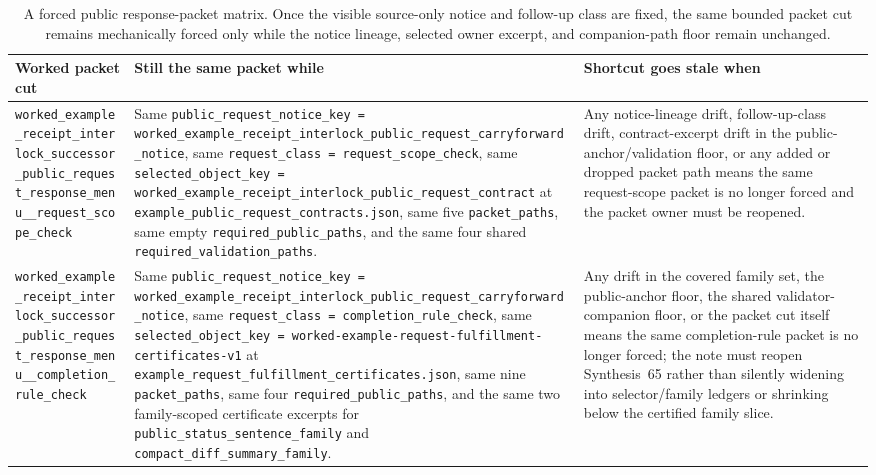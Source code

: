 \documentclass[11pt]{article}
\begin{document}
\begin{table}[t]
\centering
\footnotesize
\begin{tabularx}{\linewidth}{@{}lX X@{}}
\toprule
Worked packet cut & Still the same packet while & Shortcut goes stale when \\
\midrule
\nolinkurl{worked_example_receipt_interlock_successor_public_request_response_menu__request_scope_check} & Same \nolinkurl{public_request_notice_key = worked_example_receipt_interlock_public_request_carryforward_notice}, same \nolinkurl{request_class = request_scope_check}, same \nolinkurl{selected_object_key = worked_example_receipt_interlock_public_request_contract} at \nolinkurl{example_public_request_contracts.json}, same five \nolinkurl{packet_paths}, same empty \nolinkurl{required_public_paths}, and the same four shared \nolinkurl{required_validation_paths}. & Any notice-lineage drift, follow-up-class drift, contract-excerpt drift in the public-anchor/validation floor, or any added or dropped packet path means the same request-scope packet is no longer forced and the packet owner must be reopened. \\
\nolinkurl{worked_example_receipt_interlock_successor_public_request_response_menu__completion_rule_check} & Same \nolinkurl{public_request_notice_key = worked_example_receipt_interlock_public_request_carryforward_notice}, same \nolinkurl{request_class = completion_rule_check}, same \nolinkurl{selected_object_key = worked-example-request-fulfillment-certificates-v1} at \nolinkurl{example_request_fulfillment_certificates.json}, same nine \nolinkurl{packet_paths}, same four \nolinkurl{required_public_paths}, and the same two family-scoped certificate excerpts for \nolinkurl{public_status_sentence_family} and \nolinkurl{compact_diff_summary_family}. & Any drift in the covered family set, the public-anchor floor, the shared validator-companion floor, or the packet cut itself means the same completion-rule packet is no longer forced; the note must reopen Synthesis~65 rather than silently widening into selector/family ledgers or shrinking below the certified family slice. \\
\bottomrule
\end{tabularx}
\caption{A forced public response-packet matrix. Once the visible source-only notice and follow-up class are fixed, the same bounded packet cut remains mechanically forced only while the notice lineage, selected owner excerpt, and companion-path floor remain unchanged.}
\label{tab:forced-public-response-packet-matrix}
\end{table}
\end{document}
